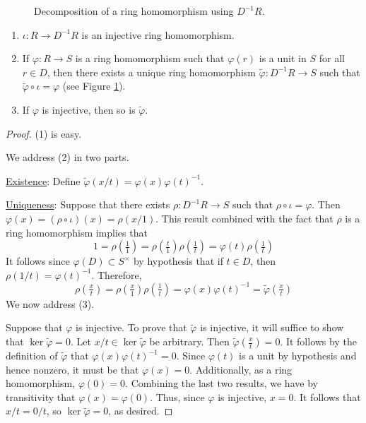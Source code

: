 \documentclass[../notes.tex]{subfiles}
\begin{document}
\begin{itemize}
\begin{figure}[H]
        \caption{Decomposition of a ring homomorphism using $D^{-1}R$.}
        \label{fig:fracDecomp}
    \end{figure}
    \begin{enumerate}[label={(\arabic*)}]
        \item $\iota:R\to D^{-1}R$ is an injective ring homomorphism.
        \item If $\varphi:R\to S$ is a ring homomorphism such that $\varphi(r)$ is a unit in $S$ for all $r\in D$, then there exists a unique ring homomorphism $\tilde{\varphi}:D^{-1}R\to S$ such that $\tilde{\varphi}\circ\iota=\varphi$ (see Figure \ref{fig:fracDecomp}).
        \item If $\varphi$ is injective, then so is $\tilde{\varphi}$.
    \end{enumerate}
    \begin{proof}
        (1) is easy.\par\smallskip
        We address (2) in two parts.\par
        \underline{Existence}: Define $\tilde{\varphi}(x/t)=\varphi(x)\varphi(t)^{-1}$.\par
        \underline{Uniqueness}: Suppose that there exists $\rho:D^{-1}R\to S$ such that $\rho\circ\iota=\varphi$. Then $\varphi(x)=(\rho\circ\iota)(x)=\rho(x/1)$. This result combined with the fact that $\rho$ is a ring homomorphism implies that
        \begin{equation*}
            1 = \rho(\tfrac{1}{1})
            = \rho(\tfrac{t}{1})\rho(\tfrac{1}{t})
            = \varphi(t)\rho(\tfrac{1}{t})
        \end{equation*}
        It follows since $\varphi(D)\subset S^\times$ by hypothesis that if $t\in D$, then $\rho(1/t)=\varphi(t)^{-1}$. Therefore,
        \begin{equation*}
            \rho(\tfrac{x}{t}) = \rho(\tfrac{x}{1})\rho(\tfrac{1}{t})
            = \varphi(x)\varphi(t)^{-1}
            = \tilde{\varphi}(\tfrac{x}{t})
        \end{equation*}\smallskip
        We now address (3).\par
        Suppose that $\varphi$ is injective. To prove that $\tilde{\varphi}$ is injective, it will suffice to show that $\ker\tilde{\varphi}=0$. Let $x/t\in\ker\tilde{\varphi}$ be arbitrary. Then $\tilde{\varphi}(\tfrac{x}{t})=0$. It follows by the definition of $\tilde{\varphi}$ that $\varphi(x)\varphi(t)^{-1}=0$. Since $\varphi(t)$ is a unit by hypothesis and hence nonzero, it must be that $\varphi(x)=0$. Additionally, as a ring homomorphism, $\varphi(0)=0$. Combining the last two results, we have by transitivity that $\varphi(x)=\varphi(0)$. Thus, since $\varphi$ is injective, $x=0$. It follows that $x/t=0/t$, so $\ker\tilde{\varphi}=0$, as desired.
    \end{proof}
\end{itemize}
\end{document}
